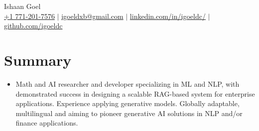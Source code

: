 \documentclass[letterpaper,10pt]{article}
\newcommand\indentsize{10pt}
\newcommand{\resumeSubHeadingListStart}{\begin{itemize}[leftmargin=0.15in, label=]}
\newcommand{\resumeSubHeadingListEnd}{\end{itemize}}
\begin{document}

\begin{center}
    \Huge Ishaan Goel \\ \vspace{2pt}
    \large
    \href{tel:17712017576}{+1 771-201-7576}
    $|$ \href{mailto:igoeldxb@gmail.com}{igoeldxb@gmail.com}
    $|$ \href{https://linkedin.com/in/igoeldc/}{linkedin.com/in/igoeldc/}
    $|$ 
    \href{https://github.com/igoeldc}{github.com/igoeldc}
\end{center}

\section{Summary}
  \resumeSubHeadingListStart
    \item{Math and AI researcher and developer specializing in ML and NLP, with demonstrated success in designing a scalable RAG-based system for enterprise applications. Experience applying generative models. Globally adaptable, multilingual and aiming to pioneer generative AI solutions in NLP and/or finance applications.}\vspace{-5pt}
  \resumeSubHeadingListEnd

\newcommand{\resumeEducationHeading}[9]{
  \item
    \begin{tabular*}{0.97\textwidth}[t]{l@{\extracolsep{\fill}}r}
      \textbf{#1} {#2} & #3 \\
      \hspace{\indentsize} #4 & #5 \\
      \hspace{20pt} #6 & \\
      \hspace{20pt} \textit{#7} & \\
      \hspace{\indentsize} #8 & #9
    \end{tabular*}
}
\end{document}
